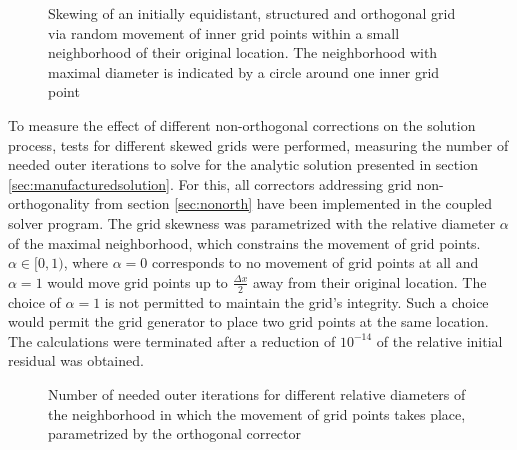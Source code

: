 \begin{figure}[h!]
  \begin{center}
    
    \caption{Skewing of an initially equidistant, structured and orthogonal grid via random movement of inner grid points within a small neighborhood of their original location. The neighborhood with maximal diameter is indicated by a circle around one inner grid point}
    \label{fig:nonorthgrid}
  \end{center}
\end{figure}

To measure the effect of different non-orthogonal corrections on the solution process, tests for different skewed grids were performed, measuring the number of needed outer iterations to solve for the analytic solution presented in section \ref{sec:manufacturedsolution}.  For this, all correctors addressing grid non-orthogonality from section \ref{sec:nonorth} have been implemented in the coupled solver program. The grid skewness was parametrized with the relative diameter \(\alpha\) of the maximal neighborhood, which constrains the movement of grid points. \(\alpha \in [0,1) \), where \(\alpha = 0\) corresponds to no movement of grid points at all and \(\alpha = 1\) would move grid points up to \(\textstyle \frac{\Delta x}{2} \) away from their original location. The choice of \(\alpha = 1\) is not permitted to maintain the grid's integrity. Such a choice would permit the grid generator to place two grid points at the same location. The calculations were terminated after a reduction of \(10^{-14}\) of the relative initial residual was obtained.

\begin{figure}
  \begin{center}
  \end{center}
\caption{Number of needed outer iterations for different relative diameters of the neighborhood in which the movement of grid points takes place, parametrized by the orthogonal corrector}
\label{fig:nonorth}
\end{figure}

